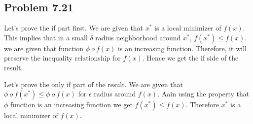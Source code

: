 \documentclass[letterpaper,12pt]{article}
\theoremstyle{definition}
\begin{document}
\subsection*{Problem 7.21}

Let's prove the if part first. We are given that $x^*$ is a local minimizer of $f(x)$. This implies that in a small $\delta$ radius neighborhood around $x^*$, $f(x^*) \leq f(x) $. we are given that function $\phi \ o \ f(x) $ is an increasing function. Therefore, it will preserve the inequality relationship for $f(x)$. Hence we get the if side of the result.\\

\begin{flushleft}
Let's prove the only if part of the result. We are given that $\phi \ o \ f(x^*) \leq  \phi \ o \ f(x)$ for $\epsilon$ radius around $f(x)$. Aain using the property that $\phi$ function is an increasing function we get $f(x^*) \leq f(x) $. Therefore $x^*$ is a local minimizer of $f(x)$.

\end{flushleft}
\end{document}

